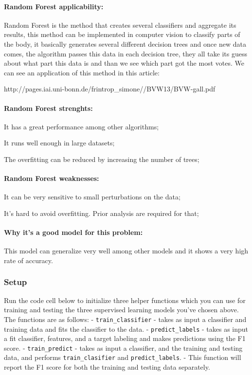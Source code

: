 \documentclass[11pt]{article}
\begin{document}
\paragraph{Random Forest
applicability:}\label{random-forest-applicability}

Random Forest is the method that creates several classifiers and
aggregate its results, this method can be implemented in computer vision
to classify parts of the body, it basically generates several different
decision trees and once new data comes, the algorithm passes this data
in each decision tree, they all take its guess about what part this data
is and than we see which part got the most votes. We can see an
application of this method in this article:

http://pages.iai.uni-bonn.de/frintrop\_simone//BVW13/BVW-gall.pdf

\paragraph{Random Forest strenghts:}\label{random-forest-strenghts}

It has a great performance among other algorithms;

It runs well enough in large datasets;

The overfitting can be reduced by increasing the number of trees;

\paragraph{Random Forest weaknesses:}\label{random-forest-weaknesses}

It can be very sensitive to small perturbations on the data;

It's hard to avoid overfitting. Prior analysis are required for that;

\paragraph{Why it's a good model for this
problem:}\label{why-its-a-good-model-for-this-problem-2}

This model can generalize very well among other models and it shows a
very high rate of accuracy.

    \subsubsection{Setup}\label{setup}

Run the code cell below to initialize three helper functions which you
can use for training and testing the three supervised learning models
you've chosen above. The functions are as follows: -
\texttt{train\_classifier} - takes as input a classifier and training
data and fits the classifier to the data. - \texttt{predict\_labels} -
takes as input a fit classifier, features, and a target labeling and
makes predictions using the F1 score. - \texttt{train\_predict} - takes
as input a classifier, and the training and testing data, and performs
\texttt{train\_clasifier} and \texttt{predict\_labels}. - This function
will report the F1 score for both the training and testing data
separately.
\end{document}
